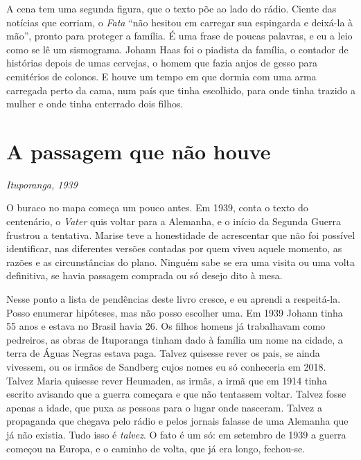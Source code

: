 \documentclass[
  brazilian,
  11pt,
  openany]{book}
\begin{document}
A cena tem uma segunda figura, que o texto põe ao lado do rádio. Ciente
das notícias que corriam, o \emph{Fata} ``não hesitou em carregar sua
espingarda e deixá-la à mão'', pronto para proteger a família. É uma
frase de poucas palavras, e eu a leio como se lê um sismograma. Johann
Haas foi o piadista da família, o contador de histórias depois de umas
cervejas, o homem que fazia anjos de gesso para cemitérios de colonos. E
houve um tempo em que dormia com uma arma carregada perto da cama, num
país que tinha escolhido, para onde tinha trazido a mulher e onde tinha
enterrado dois filhos.

\section{A passagem que não houve}\label{a-passagem-que-nuxe3o-houve}

\emph{Ituporanga, 1939}

O buraco no mapa começa um pouco antes. Em 1939, conta o texto do
centenário, o \emph{Vater} quis voltar para a Alemanha, e o início da
Segunda Guerra frustrou a tentativa. Marise teve a honestidade de
acrescentar que não foi possível identificar, nas diferentes versões
contadas por quem viveu aquele momento, as razões e as circunstâncias do
plano. Ninguém sabe se era uma visita ou uma volta definitiva, se havia
passagem comprada ou só desejo dito à mesa.

Nesse ponto a lista de pendências deste livro cresce, e eu aprendi a
respeitá-la. Posso enumerar hipóteses, mas não posso escolher uma. Em
1939 Johann tinha 55 anos e estava no Brasil havia 26. Os filhos homens
já trabalhavam como pedreiros, as obras de Ituporanga tinham dado à
família um nome na cidade, a terra de Águas Negras estava paga. Talvez
quisesse rever os pais, se ainda vivessem, ou os irmãos de Sandberg
cujos nomes eu só conheceria em 2018. Talvez Maria quisesse rever
Heumaden, as irmãs, a irmã que em 1914 tinha escrito avisando que a
guerra começara e que não tentassem voltar. Talvez fosse apenas a idade,
que puxa as pessoas para o lugar onde nasceram. Talvez a propaganda que
chegava pelo rádio e pelos jornais falasse de uma Alemanha que já não
existia. Tudo isso é \emph{talvez}. O fato é um só: em setembro de 1939
a guerra começou na Europa, e o caminho de volta, que já era longo,
fechou-se.
\end{document}
